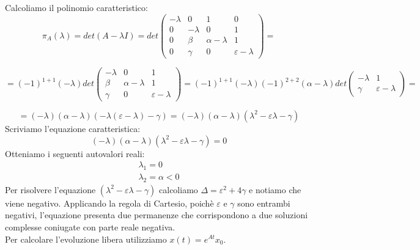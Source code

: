 Calcoliamo il polinomio caratteristico:
\begin{displaymath}
\pi_{A}(\lambda)=det(A-\lambda I)=det\left(\begin{array}{cccc}
-\lambda & 0 & 1 & 0\\
0 & -\lambda & 0 & 1\\
0 & \beta & \alpha-\lambda & 1\\
0 & \gamma & 0 & \varepsilon-\lambda
\end{array}\right)=
\end{displaymath}
\begin{scriptsize}
\begin{displaymath}
=(-1)^{1+1}(-\lambda)det\left(\begin{array}{ccc}
-\lambda & 0 & 1\\
\beta & \alpha-\lambda & 1\\
\gamma & 0 & \varepsilon-\lambda
\end{array}\right)=(-1)^{1+1}(-\lambda)(-1)^{2+2}(\alpha-\lambda)det\left(\begin{array}{cc}
-\lambda & 1\\
\gamma & \varepsilon-\lambda
\end{array}\right)= 
\end{displaymath}
\end{scriptsize}
\begin{displaymath}
=(-\lambda)(\alpha-\lambda)(-\lambda(\varepsilon-\lambda)-\gamma)=(-\lambda)(\alpha-\lambda)(\lambda^{2}-\varepsilon\lambda-\gamma)
\end{displaymath}
Scriviamo l'equazione caratteristica:
\begin{displaymath}
(-\lambda)(\alpha-\lambda)(\lambda^{2}-\varepsilon\lambda-\gamma) = 0
\end{displaymath}
Otteniamo i seguenti autovalori reali:
\begin{displaymath}
\begin{array}{cc}
\lambda_1=0 \\
\lambda_2=\alpha<0
\end{array}
\end{displaymath}
Per risolvere l'equazione $(\lambda^{2}-\varepsilon\lambda-\gamma)$ calcoliamo $\Delta=\varepsilon^2+4\gamma$ e notiamo che viene negativo.
Applicando la regola di Cartesio, poichè $\varepsilon$ e $\gamma$ sono entrambi negativi, l'equazione presenta due permanenze che corrispondono a due soluzioni complesse coniugate con parte reale negativa. \\
Per calcolare l'evoluzione libera utilizziamo $x(t)=e^{At}x_{0}$. \\
